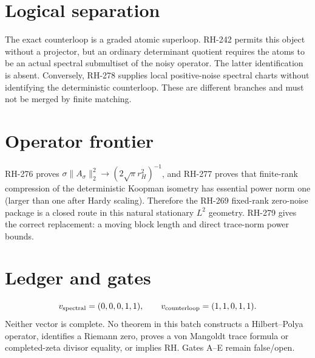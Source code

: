 \documentclass[11pt]{article}
\begin{document}
\section{Logical separation}
The exact counterloop is a graded atomic superloop.  RH-242 permits this
object without a projector, but an ordinary determinant quotient requires the
atoms to be an actual spectral submultiset of the noisy operator.  The latter
identification is absent.  Conversely, RH-278 supplies local positive-noise
spectral charts without identifying the deterministic counterloop.  These are
different branches and must not be merged by finite matching.
\section{Operator frontier}
RH-276 proves
$\sigma\|A_\sigma\|_2^2\to(2\sqrt\pi r_H^2)^{-1}$, and RH-277 proves that
finite-rank compression of the deterministic Koopman isometry has essential
power norm one (larger than one after Hardy scaling).  Therefore the RH-269
fixed-rank zero-noise package is a closed route in this natural stationary
$L^2$ geometry.  RH-279 gives the correct replacement: a moving block length
and direct trace-norm power bounds.
\section{Ledger and gates}
\[
 v_{\rm spectral}=(0,0,0,1,1),\qquad
 v_{\rm counterloop}=(1,1,0,1,1).
\]
Neither vector is complete.  No theorem in this batch constructs a
Hilbert--Polya operator, identifies a Riemann zero, proves a von Mangoldt
trace formula or completed-zeta divisor equality, or implies RH.  Gates A--E
remain false/open.
\end{document}
